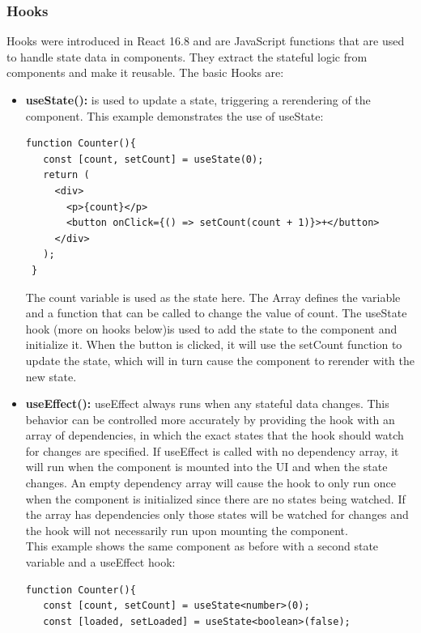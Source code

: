 \subsubsection{Hooks}
Hooks were introduced in React 16.8 and are JavaScript functions that are used to handle state data in components. They  extract the stateful logic from components and make it reusable. The basic Hooks are:
\begin{itemize}
\item \textbf{useState():} is used to update a state, triggering a rerendering of the component. This example demonstrates the use of useState:
\begin{Verbatim}[frame=single]
 function Counter(){
   const [count, setCount] = useState(0);
   return (
     <div>
       <p>{count}</p>		            
       <button onClick={() => setCount(count + 1)}>+</button>
     </div>
   );
 }
\end{Verbatim}
The count variable is used as the state here. The Array defines the variable and a function that can be called to change the value of count. The useState hook (more on hooks below)is used to add the state to the component and initialize it. When the button is clicked, it will use the setCount function to update the state, which will in turn cause the component to rerender with the new state.
\item \textbf{useEffect():} useEffect always runs when any stateful data changes. This behavior can be controlled more accurately by providing the hook with an array of dependencies, in which the exact states that the hook should watch for changes are specified. If useEffect is called with no dependency array, it will run when the component is mounted into the UI and when the state changes. An empty dependency array will cause the hook to only run once when the component is initialized since there are no states being watched. If the array has dependencies only those states will be watched for changes and the hook will not necessarily run upon mounting the component.\\This example shows the same component as before with a second state variable and a useEffect hook:
\begin{Verbatim}[frame=single]
 function Counter(){
   const [count, setCount] = useState<number>(0);
   const [loaded, setLoaded] = useState<boolean>(false);
   

\end{Verbatim}
\end{itemize}
